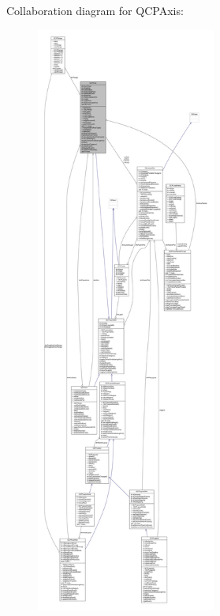 Collaboration diagram for Q\+C\+P\+Axis\+:\nopagebreak
\begin{figure}[H]
\begin{center}
\leavevmode
\includegraphics[height=550pt]{class_q_c_p_axis__coll__graph}
\end{center}
\end{figure}
